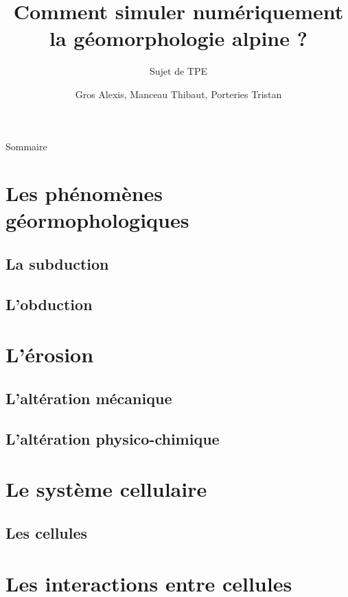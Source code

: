 \documentclass{beamer}
\title{Comment simuler numériquement la géomorphologie alpine ?}
\subtitle{Sujet de TPE}
\author{Gros Alexis, Manceau Thibaut, Porteries Tristan}
\begin{document}
\frame{\titlepage}

\begin{frame}{Sommaire}
\small \tableofcontents
\end{frame}

\section{Les phénomènes géormophologiques}
\subsection{La subduction}
\begin{frame}
\end{frame}

\subsection{L'obduction}
\begin{frame}
\end{frame}

\section{L'érosion}
\subsection{L'altération mécanique}
\begin{frame}
\end{frame}

\subsection{L'altération physico-chimique}
\begin{frame}
\end{frame}

\section{Le système cellulaire}
\subsection{Les cellules}
\begin{frame}
\end{frame}

\section{Les interactions entre cellules}
\end{document}
